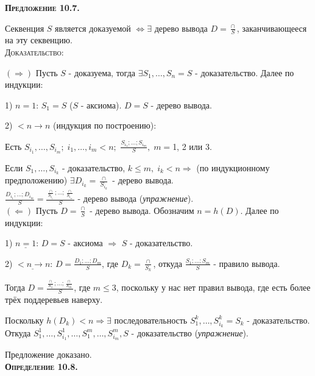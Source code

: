 \documentclass[18pt, a4paper]{extarticle}
\begin{document}
\textbf{\textsc{Предложение 10.7.}} 

Секвенция $S$ является доказуемой $\Leftrightarrow \exists$ дерево вывода $D = \displaystyle\frac{\cap}{S}$, заканчивающееся на эту секвенцию. \\

\textsc{Доказательство:} 

$\boxed{(\Rightarrow)}$ Пусть $S$ - доказуема, тогда $\exists S_1,\ldots,S_n = S$ - доказательство. Далее по индукции:

1) \underline{$n = 1$}: $S_1 = S$ ($S$ -  аксиома). $D = S$ -  дерево вывода.

2) \underline{$<n\to n$} (индукция по построению):

Есть $S_{i_1},\ldots,S_{i_m}; \; i_1,\ldots,i_m < n;$ $\displaystyle \frac{S_{i_1};\ldots;S_{i_m}}{S}, \; m = $1, 2 или 3.

Если $S_1,\ldots,S_{i_k}$ -  доказательство, $k\leqslant m, \; i_k < n \Rightarrow$ (по индукционному предположению) $\exists D_{i_k} = \displaystyle \frac{\cap}{S_{i_k}}$ -  дерево вывода.\\

$\displaystyle \frac{D_{i_1};\ldots; D_{i_m}}{S} = \frac{\displaystyle \frac{\cap}{S_{i_1}};\ldots;\frac{\cap}{S_{i_m}}}{S}$ -  дерево вывода (\textit{упражнение}).\\

$\boxed{(\Leftarrow)}$ Пусть $D = \displaystyle \frac{\cap}{S}$ -  дерево вывода. Обозначим $n = h(D)$. Далее по индукции:

1) $\underline{n = 1}$: $D = S$ -  аксиома $\Rightarrow$ $S$ -  доказательство.

2) $\underline{<n\to n}$: $D = \displaystyle\frac{D_1;\ldots;D_m}{S}$, где $D_k = \displaystyle\frac{\cap}{S_k}$, откуда $\displaystyle \frac{S_1;\ldots;S_m}{S}$ -  правило вывода.

Тогда $D = \displaystyle\frac{\displaystyle\frac{\cap}{S_1};\ldots;\frac{\cap}{S_m}}{S}$, где $m\leqslant 3$, поскольку у нас нет правил вывода, где есть более трёх поддеревьев наверху.

Поскольку $h(D_k)<n \Rightarrow \exists$ последовательность $S^k_1,\ldots,S^k_{i_k} = S_k$ - доказательство. Откуда $S^1_1,\ldots,S^1_{i_1},\ldots,S_1^m,\ldots,S^m_{i_m}, S$ -  доказательство (\textit{упражнение}).

Предложение доказано.\\

\textbf{\textsc{Определение 10.8.}} 
\end{document}
